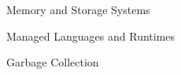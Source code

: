 
\begin{minipage}[t]{.33\linewidth}
  \begin{cvitems}
    \item Memory and Storage Systems
  \end{cvitems}
\end{minipage}%
%
\hspace{40pt}
%
\begin{minipage}[t]{.33\linewidth}
  \begin{cvitems}
    \item Managed Languages and Runtimes
  \end{cvitems}
\end{minipage}%
%
\hspace{35pt}
%
\begin{minipage}[t]{.33\linewidth}
  \begin{cvitems}
    \item Garbage Collection
  \end{cvitems}
\end{minipage}

\vspace{15pt}
